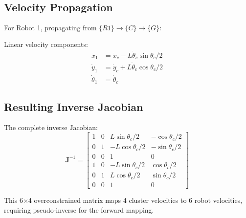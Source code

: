 \documentclass[lettersize,journal]{IEEEtran}
\begin{document}
\subsection{Velocity Propagation}

For Robot 1, propagating from $\{R1\} \to \{C\} \to \{G\}$:

Linear velocity components:
\begin{align}
\dot{x}_1 &= \dot{x}_c - L\dot{\theta}_c\sin\theta_c/2 \\
\dot{y}_1 &= \dot{y}_c + L\dot{\theta}_c\cos\theta_c/2 \\
\dot{\theta}_1 &= \dot{\theta}_c
\end{align}

\subsection{Resulting Inverse Jacobian}

The complete inverse Jacobian:
$$\mathbf{J}^{-1} = \begin{bmatrix}
1 & 0 & L\sin\theta_c/2 & -\cos\theta_c/2 \\
0 & 1 & -L\cos\theta_c/2 & -\sin\theta_c/2 \\
0 & 0 & 1 & 0 \\
1 & 0 & -L\sin\theta_c/2 & \cos\theta_c/2 \\
0 & 1 & L\cos\theta_c/2 & \sin\theta_c/2 \\
0 & 0 & 1 & 0
\end{bmatrix}$$

This 6×4 overconstrained matrix maps 4 cluster velocities to 6 robot velocities, requiring pseudo-inverse for the forward mapping.



\end{document}
